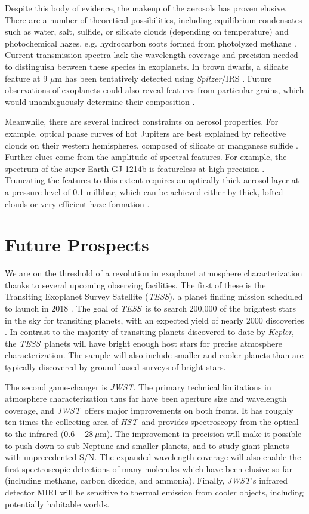\documentclass[graybox,natbib,nosecnum]{svmult}
\newcommand{\project}[1]{\textsl{#1}}
\newcommand{\JWST}{\project{JWST}}
\newcommand{\HST}{\project{HST}}
\newcommand{\TESS}{\project{TESS}}
\newcommand{\Spitzer}{\project{Spitzer}}
\newcommand{\Kepler}{\project{Kepler}}
\begin{document}
Despite this body of evidence, the makeup of the aerosols has proven elusive. There are a number of theoretical possibilities, including equilibrium condensates such as water, salt, sulfide, or silicate clouds (depending on temperature) and photochemical hazes, e.g. hydrocarbon soots formed from photolyzed methane \citep{burrows99, kempton12, morley13, wakeford17}. Current transmission spectra lack the wavelength coverage and precision needed to distinguish between these species in exoplanets.  In brown dwarfs, a silicate feature at 9 $\mu$m has been tentatively detected using \Spitzer/IRS \citep{cushing06}. Future observations of exoplanets could also reveal features from particular grains, which would unambiguously determine their composition \citep{wakeford15}.

Meanwhile, there are several indirect constraints on aerosol properties.  For example, optical phase curves of hot Jupiters are best explained by reflective clouds on their western hemispheres, composed of silicate or manganese sulfide \citep{demory13, oreshenko16, parmentier16}. Further clues come from the amplitude of spectral features. For example, the spectrum of the super-Earth GJ 1214b is featureless at high precision \citep[30 ppm,][]{kreidberg14a}.  Truncating the features to this extent requires an optically thick aerosol layer at a pressure level of 0.1 millibar, which can be achieved either by thick, lofted clouds or very efficient haze formation \citep{morley15}.  

\section{Future Prospects}
We are on the threshold of a revolution in exoplanet atmosphere characterization thanks to several upcoming observing facilities.  The first of these is the Transiting Exoplanet Survey Satellite (\TESS), a planet finding mission scheduled to launch in 2018 \citep{ricker14}.  The goal of \TESS\ is to search 200,000 of the brightest stars in the sky for transiting planets, with an expected yield of nearly 2000 discoveries \citep{sullivan15}. In contrast to the majority of transiting planets discovered to date by \Kepler, the \TESS\ planets will have bright enough host stars for precise atmosphere characterization. The sample will also include smaller and cooler planets than are typically discovered by ground-based surveys of bright stars. 

The second game-changer is \JWST. The primary technical limitations in atmosphere characterization thus far have been aperture size and wavelength coverage, and \JWST\ offers major improvements on both fronts. It has roughly ten times the collecting area of \HST\, and provides spectroscopy from the optical to the infrared ($0.6 - 28\,\mu$m). The improvement in precision will make it possible to push down to sub-Neptune and smaller planets, and to study giant planets with unprecedented S/N. The expanded wavelength coverage will also enable the first spectroscopic detections of many molecules which have been elusive so far (including methane, carbon dioxide, and ammonia). Finally, \JWST's infrared detector MIRI will be sensitive to thermal emission from cooler objects, including potentially habitable worlds.
\end{document}
